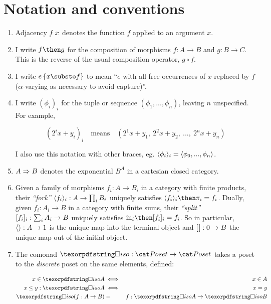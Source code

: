 \documentclass[nomarginums]{rntz}\usepackage[tablet]{fantasy}%
\begin{document}


\section{Notation and conventions}

\begin{enumerate}
\item Adjacency $f\<x$ denotes the function $f$ applied to an argument $x$.

\item I write $f \then g$ for the composition of morphisms $f : A \to B$ and $g
  : B \to C$. This is the reverse of the usual composition operator, $g \circ
  f$.

\item I write $\subst{e}{x \substo f}$ to mean ``$e$ with all free occurrences of $x$
  replaced by $f$ ($\alpha$-varying as necessary to avoid capture)''.

  \newcommand\iexpr{\phi}
\item I write $(\iexpr_i)_i$ for the tuple or sequence $(\iexpr_1,
  ..., \iexpr_n)$, leaving $n$ unspecified. For example,

  \nopagebreak[2]
  \[ (2^ix + y_i)_i \quad\text{means}\quad
  (2^1x + y_1,~ 2^2x + y_2,~ ...,~ 2^nx + y_n) \]

  \noindent
  I also use this notation with other braces, eg. $\fork{\iexpr_i}_i =
  \fork{\iexpr_0, ..., \iexpr_n}$.

\item $A \Rightarrow B$ denotes the exponential $B^A$ in a cartesian closed category.

\item Given a family of morphisms $f_i : A \to B_i$ in a category with finite
  products, their \emph{``fork''} $\langle{f_i}\rangle_i : A \to \textstyle\prod_{i} B_i$
  uniquely satisfies $\fork{f_i}_i \then \pi_i = f_i$. Dually, given $f_i : A_i
  \to B$ in a category with finite sums, their \emph{``split''} $[{f_i}]_i :
  \sum_i A_i \to B$ uniquely satisfies $\injc_i \then \krof{f_i}_i = f_i$.
  So in particular, $\langle{}\rangle : A \to 1$ is the unique map into the terminal
  object and $[{\kern .08em}] : 0 \to B$ the unique map out of the initial object.

\item The comonad $\iso : \Poset \to \Poset$ takes a poset to the
  \emph{discrete} poset on the same elements, defined:

  \begin{eqnarray*}
    x \in \isof A &\iff& x \in A\\
    x \le y : \isof A &\iff& x = y\\
    \isof(f : A \to B) &=& f : \isof A \to \isof B
  \end{eqnarray*}
\end{enumerate}
\end{document}
